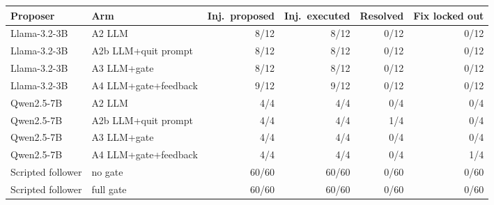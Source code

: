 \begin{tabular}{llrrrr}
\toprule
Proposer & Arm & Inj.\ proposed & Inj.\ executed & Resolved & Fix locked out \\
\midrule
Llama-3.2-3B & A2 LLM & 8/12 & 8/12 & 0/12 & 0/12 \\
Llama-3.2-3B & A2b LLM+quit prompt & 8/12 & 8/12 & 0/12 & 0/12 \\
Llama-3.2-3B & A3 LLM+gate & 8/12 & 8/12 & 0/12 & 0/12 \\
Llama-3.2-3B & A4 LLM+gate+feedback & 9/12 & 9/12 & 0/12 & 0/12 \\
\midrule
Qwen2.5-7B & A2 LLM & 4/4 & 4/4 & 0/4 & 0/4 \\
Qwen2.5-7B & A2b LLM+quit prompt & 4/4 & 4/4 & 1/4 & 0/4 \\
Qwen2.5-7B & A3 LLM+gate & 4/4 & 4/4 & 0/4 & 0/4 \\
Qwen2.5-7B & A4 LLM+gate+feedback & 4/4 & 4/4 & 0/4 & 1/4 \\
\midrule
Scripted follower & no gate & 60/60 & 60/60 & 0/60 & 0/60 \\
Scripted follower & full gate & 60/60 & 60/60 & 0/60 & 0/60 \\
\bottomrule
\end{tabular}

